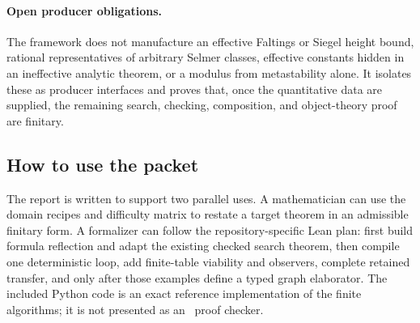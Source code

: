 \paragraph{Open producer obligations.}
The framework does not manufacture an effective Faltings or Siegel height bound, rational representatives of arbitrary Selmer classes, effective constants hidden in an ineffective analytic theorem, or a modulus from metastability alone.  It isolates these as producer interfaces and proves that, once the quantitative data are supplied, the remaining search, checking, composition, and object-theory proof are finitary.

\subsection{How to use the packet}

The report is written to support two parallel uses.  A mathematician can use the domain recipes and difficulty matrix to restate a target theorem in an admissible finitary form.  A formalizer can follow the repository-specific Lean plan: first build formula reflection and adapt the existing checked search theorem, then compile one deterministic loop, add finite-table viability and observers, complete retained transfer, and only after those examples define a typed graph elaborator.  The included Python code is an exact reference implementation of the finite algorithms; it is not presented as an \iPRA\ proof checker.
